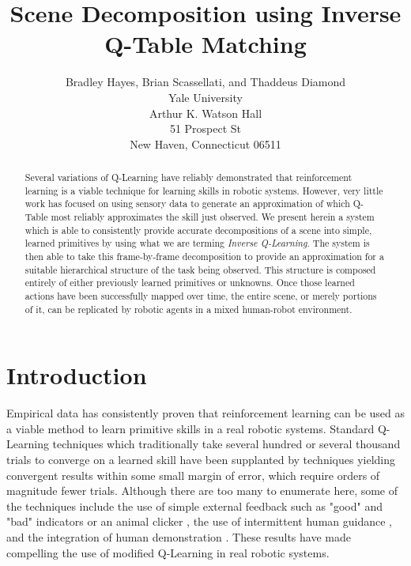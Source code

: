 \documentclass[letterpaper]{article}
\begin{document}
\title{Scene Decomposition using Inverse Q-Table Matching}
\author{Bradley Hayes, Brian Scassellati, and Thaddeus Diamond\\
Yale University\\
Arthur K. Watson Hall\\
51 Prospect St\\
New Haven, Connecticut 06511\\
}

\maketitle

\begin{abstract}
Several variations of Q-Learning have reliably demonstrated that reinforcement
learning is a viable technique for learning skills in robotic systems.  However,
very little work has focused on using sensory data to generate an approximation
of which Q-Table most reliably approximates the skill just observed.  We present
herein a system which is able to consistently provide accurate decompositions of
a scene into simple, learned primitives by using what we are terming
\textit{Inverse Q-Learning}.  The system is then able to take this
frame-by-frame decomposition to provide an approximation for a suitable 
hierarchical structure of the task being observed.  This structure is composed
entirely of either previously learned primitives or unknowns.  Once those
learned actions have been successfully mapped over time, the entire scene, or
merely portions of it, can be replicated by robotic agents in a mixed
human-robot environment.  
\end{abstract}

\section{Introduction}
\label{sec:intro}
Empirical data has consistently proven that reinforcement learning can be used
as a viable method to learn primitive skills in a real robotic systems.
Standard Q-Learning techniques which traditionally take several hundred or
several thousand trials to converge on a learned skill have been supplanted
by techniques yielding convergent results within some small margin of error,
which require orders of magnitude fewer trials.   Although there are too many
to enumerate here, some of the techniques include the use of simple external
feedback such as "good" and "bad" indicators \cite{TAMER} or an animal
clicker \cite{Clicker}, the use of intermittent human
guidance \cite{AdviceTaking,TeacherRL}, and the integration of human
demonstration \cite{DemonstrationRL}.  These results
have made compelling the use of modified Q-Learning in real robotic systems.
\end{document}
